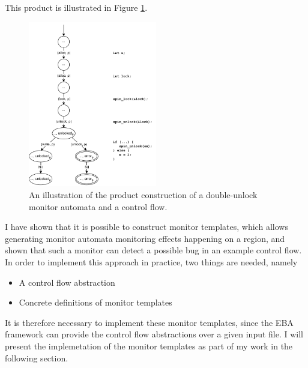 \noindent This product is illustrated in Figure \ref{cfg_unlock-product}. 

\begin{figure}[H]
    \centering
    \includegraphics[width=0.5\textwidth]{background/figures/cfg_unlock-product}
    \caption{An illustration of the product construction of a double-unlock monitor automata and a control flow.}
    \label{cfg_unlock-product}
\end{figure}

\newpar I have shown that it is possible to construct monitor templates, which allows generating monitor automata monitoring effects happening on a region, and shown that such a monitor can detect a possible bug in an example control flow. In order to implement this approach in practice, two things are needed, namely

\begin{itemize}
    \item A control flow abstraction
    \item Concrete definitions of monitor templates
\end{itemize}

\noindent It is therefore necessary to implement these monitor templates, since the EBA framework can provide the control flow abstractions over a given input file. I will present the implemetation of the monitor templates as part of my work in the following section. 